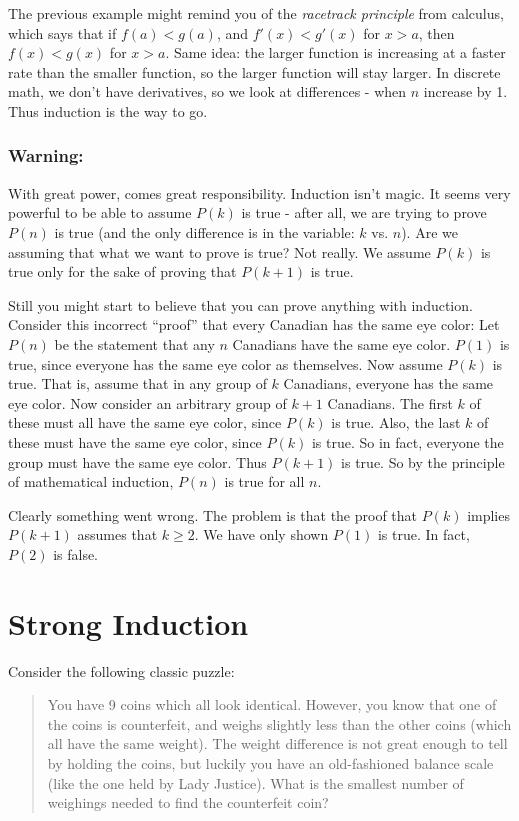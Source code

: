 \documentclass[12pt]{article}
\begin{document}
The previous example might remind you of the {\em racetrack principle} from calculus, which says that if $f(a) < g(a)$, and $f'(x) < g'(x)$ for $x > a$, then $f(x) < g(x)$ for $x > a$.  Same idea: the larger function is increasing at a faster rate than the smaller function, so the larger function will stay larger.  In discrete math, we don't have derivatives, so we look at differences - when $n$ increase by 1.  Thus induction is the way to go.

\subsubsection*{Warning:}

With great power, comes great responsibility.  Induction isn't magic.  It seems very powerful to be able to assume $P(k)$ is true - after all, we are trying to prove $P(n)$ is true (and the only difference is in the variable: $k$ vs. $n$).  Are we assuming that what we want to prove is true?  Not really.  We assume $P(k)$ is true only for the sake of proving that $P(k+1)$ is true.  

Still you might start to believe that you can prove anything with induction. Consider this incorrect ``proof'' that every Canadian has the same eye color: Let $P(n)$ be the statement that any $n$ Canadians have the same eye color.  $P(1)$ is true, since everyone has the same eye color as themselves.  Now assume $P(k)$ is true.  That is, assume that in any group of $k$ Canadians, everyone has the same eye color.  Now consider an arbitrary group of $k+1$ Canadians.  The first $k$ of these must all have the same eye color, since $P(k)$ is true.  Also, the last $k$ of these must have the same eye color, since $P(k)$ is true.  So in fact, everyone the group must have the same eye color.  Thus $P(k+1)$ is true.  So by the principle of mathematical induction, $P(n)$ is true for all $n$.

Clearly something went wrong.  The problem is that the proof that $P(k)$ implies $P(k+1)$ assumes that $k \ge 2$.  We have only shown $P(1)$ is true.  In fact, $P(2)$ is false.

\section{Strong Induction}

Consider the following classic puzzle:

\begin{quote}
	You have 9 coins which all look identical.  However, you know that one of the coins is counterfeit, and weighs slightly less than the other coins (which all have the same weight).  The weight difference is not great enough to tell by holding the coins, but luckily you have an old-fashioned balance scale (like the one held by Lady Justice).  What is the smallest number of weighings needed to find the counterfeit coin?
\end{quote}
\end{document}
